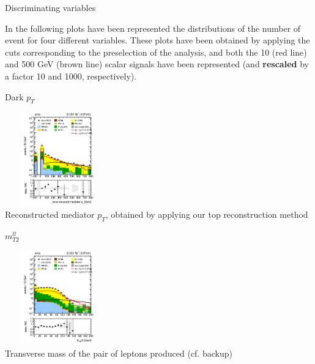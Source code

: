 \documentclass[8 pt]{beamer}
\begin{document}
\begin{frame}{Discriminating variables}

	\justifying
	In the following plots have been represented the distributions of the number of event for four different variables. These plots have been obtained by applying the cuts corresponding to the preselection of the analysis, and both the 10 (red line) and 500 GeV (brown line) scalar signals have been represented (and \textbf{rescaled} by a factor 10 and 1000, respectively). \vfill
	
	\begin{minipage}[c]{.48\linewidth}
	
   	\begin{center}
	\begin{exampleblock}{} { \begin{center} \vspace{1pt} Dark $p_T$ \vspace{1pt} \end{center}} \end{exampleblock} \vspace{5pt}
	\includegraphics[width= 130pt, height= 115pt]{figs/darkpt_log-preSel3.png} \\
	Reconstructed mediator $p_T$, obtained by applying our top reconstruction method
	\end{center}
	
	\end{minipage}
	\hspace{5pt}
	 \begin{minipage}[c]{.48\linewidth}
   	
	\begin{center}
	\begin{exampleblock}{} { \begin{center} $m_{T2}^{ll}$ \end{center}} \end{exampleblock} \vspace{5pt}
	\includegraphics[width= 130pt, height= 115pt]{figs/mt2ll_log-preSel3.png} \\
	Transverse mass of the pair of leptons produced (cf. backup)
	\end{center}
	
	\end{minipage} \vfill

\end{frame}
\end{document}
